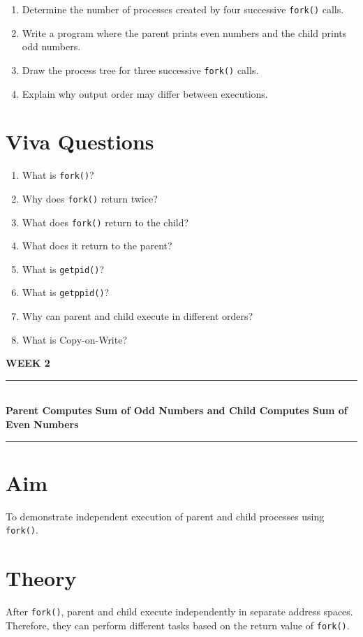 \documentclass[12pt,a4paper]{report}
\newcommand{\experimenttitle}[2]{
\clearpage
\begin{center}
{\Large\bfseries\color{univblue} WEEK #1}\\[0.15cm]
\rule{\textwidth}{1pt}\\[0.2cm]
{\LARGE\bfseries #2}\\[0.2cm]
\rule{\textwidth}{1pt}
\end{center}
\vspace{0.4cm}
}
\begin{document}
\begin{enumerate}
    \item Determine the number of processes created by four successive
    \texttt{fork()} calls.
    \item Write a program where the parent prints even numbers and the child
    prints odd numbers.
    \item Draw the process tree for three successive \texttt{fork()} calls.
    \item Explain why output order may differ between executions.
\end{enumerate}

\section*{Viva Questions}

\begin{enumerate}
    \item What is \texttt{fork()}?
    \item Why does \texttt{fork()} return twice?
    \item What does \texttt{fork()} return to the child?
    \item What does it return to the parent?
    \item What is \texttt{getpid()}?
    \item What is \texttt{getppid()}?
    \item Why can parent and child execute in different orders?
    \item What is Copy-on-Write?
\end{enumerate}


\experimenttitle{2}
{Parent Computes Sum of Odd Numbers and Child Computes Sum of Even Numbers}

\section*{Aim}

To demonstrate independent execution of parent and child processes using
\texttt{fork()}.

\section*{Theory}

After \texttt{fork()}, parent and child execute independently in separate
address spaces. Therefore, they can perform different tasks based on the return
value of \texttt{fork()}.
\end{document}
